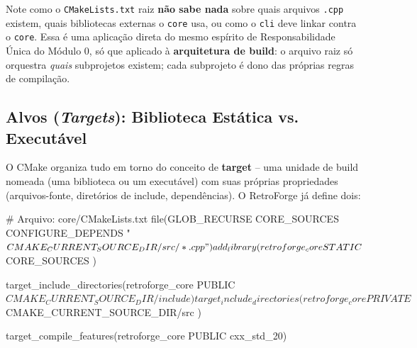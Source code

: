 \begin{CaixaInfo}
Note como o \texttt{CMakeLists.txt} raiz \textbf{não sabe nada} sobre quais arquivos \texttt{.cpp} existem, quais bibliotecas externas o \texttt{core} usa, ou como o \texttt{cli} deve linkar contra o \texttt{core}. Essa é uma aplicação direta do mesmo espírito de Responsabilidade Única do Módulo 0, só que aplicado à \textbf{arquitetura de build}: o arquivo raiz só orquestra \textit{quais} subprojetos existem; cada subprojeto é dono das próprias regras de compilação.
\end{CaixaInfo}

\subsection{Alvos (\textit{Targets}): Biblioteca Estática vs. Executável}

O CMake organiza tudo em torno do conceito de \textbf{target} -- uma unidade de build nomeada (uma biblioteca ou um executável) com suas próprias propriedades (arquivos-fonte, diretórios de include, dependências). O RetroForge já define dois:

\begin{CaixaCodigo}
# Arquivo: core/CMakeLists.txt
file(GLOB_RECURSE CORE_SOURCES
    CONFIGURE_DEPENDS
    "${CMAKE_CURRENT_SOURCE_DIR}/src/*.cpp"
)

add_library(retroforge_core STATIC
    ${CORE_SOURCES}
)

target_include_directories(retroforge_core PUBLIC
    ${CMAKE_CURRENT_SOURCE_DIR}/include
)

target_include_directories(retroforge_core PRIVATE
    ${CMAKE_CURRENT_SOURCE_DIR}/src
)

target_compile_features(retroforge_core PUBLIC cxx_std_20)
\end{CaixaCodigo}

